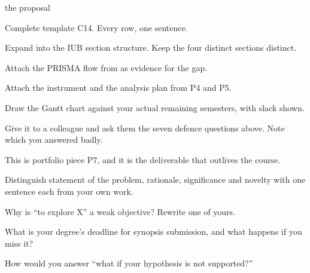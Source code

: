 \begin{traditions}{the proposal}
\end{traditions}

\begin{lab}
\begin{tightnum}
  \item Complete template C14. Every row, one sentence.
  \item Expand into the IUB section structure. Keep the four distinct sections
    distinct.
  \item Attach the PRISMA flow from  as evidence for the gap.
  \item Attach the instrument and the analysis plan from P4 and P5.
  \item Draw the Gantt chart against your actual remaining semesters, with
    slack shown.
  \item Give it to a colleague and ask them the seven defence questions above.
    Note which you answered badly.
\end{tightnum}

\medskip
This is portfolio piece P7, and it is the deliverable that outlives the course.
\end{lab}

\begin{checkpoint}
\begin{tightnum}
  \item Distinguish statement of the problem, rationale, significance and
    novelty with one sentence each from your own work.
  \item Why is ``to explore X'' a weak objective? Rewrite one of yours.
  \item What is your degree's deadline for synopsis submission, and what
    happens if you miss it?
  \item How would you answer ``what if your hypothesis is not supported?''
\end{tightnum}
\end{checkpoint}

